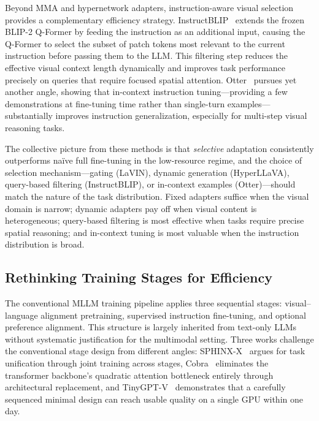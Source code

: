 Beyond MMA and hypernetwork adapters, instruction-aware visual selection provides a complementary efficiency strategy. InstructBLIP~\cite{Dai202305519} extends the frozen BLIP-2 Q-Former by feeding the instruction as an additional input, causing the Q-Former to select the subset of patch tokens most relevant to the current instruction before passing them to the LLM. This filtering step reduces the effective visual context length dynamically and improves task performance precisely on queries that require focused spatial attention. Otter~\cite{Li202306943} pursues yet another angle, showing that in-context instruction tuning---providing a few demonstrations at fine-tuning time rather than single-turn examples---substantially improves instruction generalization, especially for multi-step visual reasoning tasks.

The collective picture from these methods is that \emph{selective} adaptation consistently outperforms na\"ive full fine-tuning in the low-resource regime, and the choice of selection mechanism---gating (LaVIN), dynamic generation (HyperLLaVA), query-based filtering (InstructBLIP), or in-context examples (Otter)---should match the nature of the task distribution. Fixed adapters suffice when the visual domain is narrow; dynamic adapters pay off when visual content is heterogeneous; query-based filtering is most effective when tasks require precise spatial reasoning; and in-context tuning is most valuable when the instruction distribution is broad.

\subsection{Rethinking Training Stages for Efficiency}
\label{subsec:rethink-stages}

The conventional MLLM training pipeline applies three sequential stages: visual--language alignment pretraining, supervised instruction fine-tuning, and optional preference alignment. This structure is largely inherited from text-only LLMs without systematic justification for the multimodal setting. Three works challenge the conventional stage design from different angles: SPHINX-X~\cite{Gao202402935} argues for task unification through joint training across stages, Cobra~\cite{Zhao202403520} eliminates the transformer backbone's quadratic attention bottleneck entirely through architectural replacement, and TinyGPT-V~\cite{Yuan202316862} demonstrates that a carefully sequenced minimal design can reach usable quality on a single GPU within one day.

